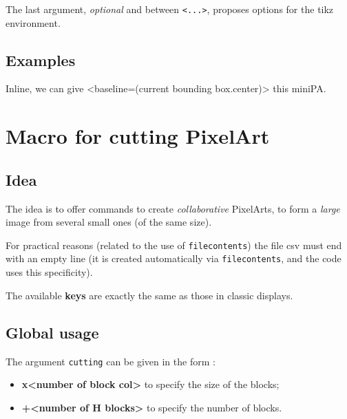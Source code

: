 \documentclass{article}
\newcommand\Cle[1]{{\bfseries\sffamily\textlangle #1\textrangle}}
\begin{document}
The last argument, \textit{optional} and between \texttt{<...>}, proposes options for the \textsf{tikz} environment.

\subsection{Examples}

\begin{PresentationCode}{}
\end{PresentationCode}

\begin{PresentationCode}{}
Inline, we can give <baseline=(current bounding box.center)>
this miniPA.
\end{PresentationCode}

\newpage

\section{Macro for cutting PixelArt}

\subsection{Idea}

The idea is to offer commands to create \textit{collaborative} PixelArts, to form a \textit{large} image from several small ones (of the same size).

\smallskip

{\footnotesize\faBomb} For practical reasons (related to the use of \texttt{filecontents}) the file \textsf{csv} must end with an empty line (it is created automatically via \texttt{filecontents}, and the code uses this specificity).

\smallskip

The available \Cle{keys} are exactly the same as those in classic displays.

\subsection{Global usage}

The argument \texttt{cutting} can be given in the form :
%
\begin{itemize}
	\item \Cle{<number of block length>x<number of block col>} to specify the size of the blocks;
	\item \Cle{<number of V blocks>+<number of H blocks>} to specify the number of blocks.
\end{itemize}
\end{document}

